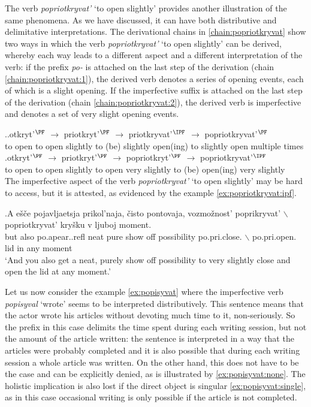 The verb \textit{popriotkryvat'} `to open slightly' provides another illustration of the same phenomena. As we have discussed, it can have both distributive and delimitative interpretations. The derivational chains in \ref{chain:popriotkryvat} show two ways in which the verb \textit{popriotkryvat'} `to open slightly' can be derived, whereby each way leads to a different aspect and a different interpretation of the verb: if the prefix \textit{po-} is attached on the last step of the derivation (chain \ref{chain:popriotkryvat:1}), the derived verb denotes a series of opening events, each of which is a slight opening. If the imperfective suffix is attached on the last step of the derivation (chain \ref{chain:popriotkryvat:2}), the derived verb is imperfective and denotes a set of very slight opening events. 

\ex.\label{chain:popriotkryvat}\ag.\label{chain:popriotkryvat:1}otkryt'$^{\PF}$ $\rightarrow$ priotkryt'$^{\PF}$ $\rightarrow$ priotkryvat'$^{\IPF}$ $\rightarrow$ popriotkryvat'$^{\PF}$\\
{to open} {} {to open slightly} {} {to (be) slightly open(ing)} {} {to slightly open multiple times}\\
\bg.\label{chain:popriotkryvat:2}otkryt'$^{\PF}$ $\rightarrow$ priotkryt'$^{\PF}$ $\rightarrow$ popriotkryt'$^{\PF}$ $\rightarrow$ popriotkryvat'$^{\IPF}$\\
{to open} {} {to open slightly} {} {to open very slightly} {} {to (be) open(ing) very slightly}\\

The imperfective aspect of the verb \textit{popriotkryvat'} `to open slightly' may be hard to access, but it is attested, as evidenced by the example \ref{ex:popriotkryvat:ipf}. 

\exg.\label{ex:popriotkryvat:ipf}A e\v{s}\v{c}e pojavljaetsja prikol'naja, \v{c}isto pontovaja, vozmo\v{z}nost' poprikryvat' {$\backslash$} popriotkryvat' kry\v{s}ku v ljuboj moment.\\
but also po.apear..refl neat pure {show off} possibility po.pri.close. {$\backslash$} po.pri.open. lid in any moment\\
`And you also get a neat, purely show off possibility to very slightly close and open the lid at any moment.'

Let us now consider the example \ref{ex:popisyvat} where the imperfective verb \textit{popisyval} `wrote' seems to be interpreted distributively. This sentence means that the actor wrote his articles without devoting much time to it, non-seriously. So the prefix in this case delimits the time spent during each writing session, but not the amount of the article written: the sentence is interpreted in a way that the articles were probably completed and it is also possible that during each writing session a whole article was written. On the other hand, this does not have to be the case and can be explicitly denied, as is illustrated by \ref{ex:popisyvat:none}. The holistic implication is also lost if the direct object is singular \ref{ex:popisyvat:single}, as in this case occasional writing is only possible if the article is not completed. 

